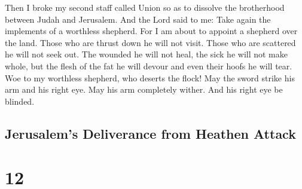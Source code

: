  Then I broke my second staff called Union so as to
dissolve the brotherhood between Judah and Jerusalem.  And
the Lord said to me: Take again the implements of a worthless shepherd.
 For I am about to appoint a shepherd over the land. Those
who are thrust down he will not visit. Those who are scattered he will
not seek out. The wounded he will not heal, the sick he will not make
whole, but the flesh of the fat he will devour and even their hoofs he
will tear.  Woe to my worthless shepherd, who deserts the
flock! May the sword strike his arm and his right eye. May his arm
completely wither. And his right eye be blinded.

\hypertarget{jerusalems-deliverance-from-heathen-attack}{%
\subsection{Jerusalem's Deliverance from Heathen
Attack}\label{jerusalems-deliverance-from-heathen-attack}}

\hypertarget{section-11}{%
\section{12}\label{section-11}}

